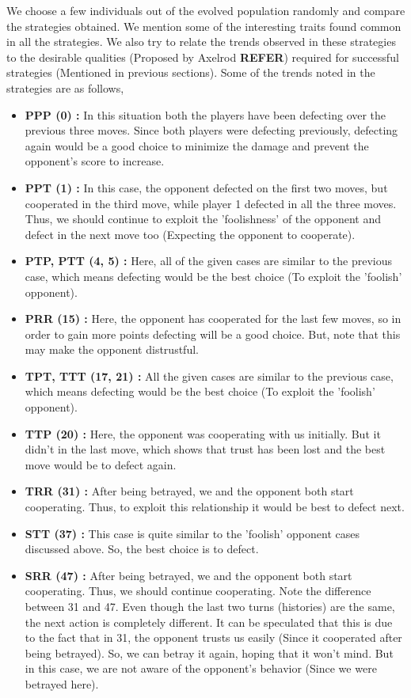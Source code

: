 \documentclass[a4paper]{article}
\begin{document}
	We choose a few individuals out of the evolved population randomly and compare the strategies obtained. We mention some of the interesting traits found common in all the strategies. We also try to relate the trends observed in these strategies to the desirable qualities (Proposed by Axelrod \textbf{REFER}) required for successful strategies (Mentioned in previous sections). Some of the trends noted in the strategies are as follows,
	\begin{itemize}
	\item \textbf{PPP (0) :} In this situation both the players have been defecting over the previous three moves. Since both players were defecting previously, defecting again would be a good choice to minimize the damage and prevent the opponent's score to increase.
	\item \textbf{PPT (1) :} In this case, the opponent defected on the first two moves, but cooperated in the third move, while player 1 defected in all the three moves. Thus, we should continue to exploit the 'foolishness' of the opponent and defect in the next move too (Expecting the opponent to cooperate).
	\item \textbf{PTP, PTT (4, 5) :} Here, all of the given cases are similar to the previous case, which means defecting would be the best choice (To exploit the 'foolish' opponent).
	\item \textbf{PRR (15) :} Here, the opponent has cooperated for the last few moves, so in order to gain more points defecting will be a good choice. But, note that this may make the opponent distrustful.
	\item \textbf{TPT, TTT (17, 21) :} All the given cases are similar to the previous case, which means defecting would be the best choice (To exploit the 'foolish' opponent).
	\item \textbf{TTP (20) :} Here, the opponent was cooperating with us initially. But it didn't in the last move, which shows that trust has been lost and the best move would be to defect again.
	\item \textbf{TRR (31) :} After being betrayed, we and the opponent both start cooperating. Thus, to exploit this relationship it would be best to defect next.
	\item \textbf{STT (37) :} This case is quite similar to the 'foolish' opponent cases discussed above. So, the best choice is to defect.
	\item \textbf{SRR (47) :} After being betrayed, we and the opponent both start cooperating. Thus, we should continue cooperating. Note the difference between 31 and 47. Even though the last two turns (histories) are the same, the next action is completely different. It can be speculated that this is due to the fact that in 31, the opponent trusts us easily (Since it cooperated after being betrayed). So, we can betray it again, hoping that it won't mind. But in this case, we are not aware of the opponent's behavior (Since we were betrayed here).

\end{itemize}
\end{document}
